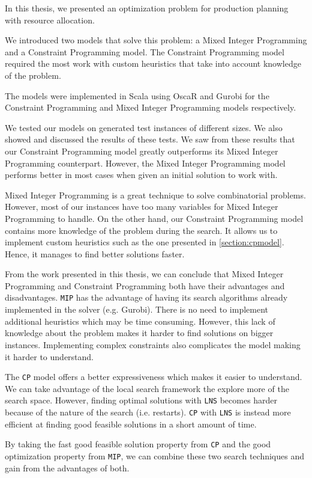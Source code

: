 \documentclass[../thesis.tex]{subfiles}
\begin{document}
In this thesis, we presented an optimization problem for production planning 
with resource allocation.

We introduced two models that solve
this problem: a Mixed Integer Programming and a Constraint Programming model.
The Constraint Programming model required the most work with custom heuristics that take into account knowledge of the problem.

The models were implemented in Scala using OscaR and Gurobi for the Constraint Programming and Mixed Integer Programming models respectively.

We tested our models on generated test instances of different sizes.
We also showed and discussed the results of these tests. We saw from these results that our Constraint Programming model greatly outperforms
its Mixed Integer Programming counterpart.
However, the Mixed Integer Programming model performs better in most cases when given an initial solution 
to work with.


Mixed Integer Programming is a great technique to solve combinatorial problems. However, most of our 
instances have too many variables for Mixed Integer Programming to handle.
On the other hand,
our Constraint Programming model contains more knowledge of the problem during the search. 
It allows us to implement custom heuristics such as the one presented in \autoref{section:cpmodel}. Hence, it manages to find 
better solutions faster. 

From the work presented in this thesis, we can conclude that Mixed Integer Programming and Constraint Programming both have their advantages and disadvantages.
\texttt{MIP} has the advantage of having its search algorithms already implemented in the solver (e.g. Gurobi). There is no need 
to implement additional heuristics which may be time consuming. However, this lack of knowledge about the problem makes 
it harder to find solutions on bigger instances. Implementing complex constraints also complicates the model making it harder to understand. 

The \texttt{CP} model offers a better expressiveness which makes it easier to understand. We can take advantage of the local search 
framework the explore more of the search space. However, finding optimal solutions with \texttt{LNS} becomes harder because of 
the nature of the search (i.e. restarts). \texttt{CP} with \texttt{LNS} is instead more efficient at finding good feasible solutions in a 
short amount of time.

By taking the fast good feasible solution property from \texttt{CP} and the good optimization property from \texttt{MIP}, we can combine these two 
search techniques and gain from the advantages of both.
\end{document}
